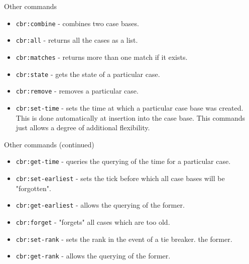 \documentclass[usenames,dvipsnames,10pt]{beamer} %
\begin{document}
\begin{frame}{Other commands}

    \begin{itemize}
        \item {\color{green}\texttt{cbr:combine}} - combines two case bases.
        \item {\color{green}\texttt{cbr:all}} - returns all the cases as a list.
        \item {\color{green}\texttt{cbr:matches}} - returns more than one match if it exists.
        \item {\color{green}\texttt{cbr:state}} - gets the state of a particular case.
        \item {\color{green}\texttt{cbr:remove}} - removes a particular case.
        \item {\color{green}\texttt{cbr:set-time}} - sets the time at which a
            particular case base was created. This is done automatically at
            insertion into the case base. This commands just allows a degree of
            additional flexibility.
    \end{itemize}
\end{frame}

\begin{frame}{Other commands (continued)}

    \begin{itemize}
        \item {\color{green}\texttt{cbr:get-time}} - queries the querying of the
            time for a particular case.
        \item {\color{green}\texttt{cbr:set-earliest}} - sets the tick before
            which all case bases will be "forgotten".
        \item {\color{green}\texttt{cbr:get-earliest}} - allows the querying of
            the former.
        \item {\color{green}\texttt{cbr:forget}} - "forgets" all cases which are too old.
        \item {\color{green}\texttt{cbr:set-rank}} - sets the rank in the event of a tie breaker.
            the former.
        \item {\color{green}\texttt{cbr:get-rank}} - allows the querying of
            the former.
    \end{itemize}

\end{frame}
\end{document}
